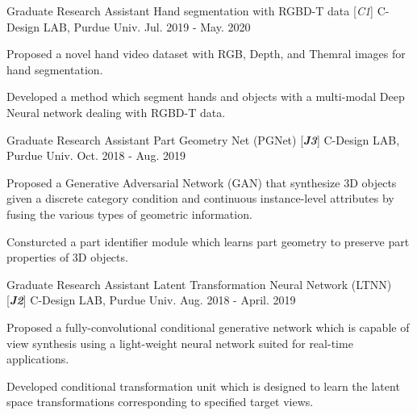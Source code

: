 \begin{cventries}
\cventry
{Graduate Research Assistant} %
{Hand segmentation with RGBD-T data [\textit{\textit{C1}}]} %
{C-Design LAB, Purdue Univ.} %
{Jul. 2019 - May. 2020} %
{ %
\begin{cvitems}
\item {Proposed a novel hand video dataset with RGB, Depth, and Themral images for hand segmentation.}
\item {Developed a method which segment hands and objects with a multi-modal Deep Neural network dealing with RGBD-T data.}
\end{cvitems}
}


\cventry
{Graduate Research Assistant} %
{Part Geometry Net (PGNet) [\textit{\textbf{J3}}]} %
{C-Design LAB, Purdue Univ.} %
{Oct. 2018 - Aug. 2019} %
{ %
\begin{cvitems}
\item {Proposed a Generative Adversarial Network (GAN) that synthesize 3D objects given a discrete category condition and continuous instance-level attributes by fusing the various types of geometric information.}
\item {Consturcted a part identifier module which learns part geometry to preserve part properties of 3D objects.}
\end{cvitems}
}


\cventry
{Graduate Research Assistant} %
{Latent Transformation Neural Network (LTNN) [\textit{\textbf{J2}}]} %
{C-Design LAB, Purdue Univ.} %
{Aug. 2018 - April. 2019} %
{ %
\begin{cvitems}
\item {Proposed a fully-convolutional conditional generative network which is capable of view synthesis using a light-weight neural network suited for real-time applications.}
\item {Developed conditional transformation unit which is designed to learn the latent space transformations corresponding to specified target views.}
\end{cvitems}
}




\end{cventries}
